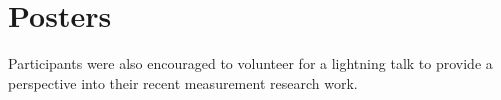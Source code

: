 \section{Posters}\label{sec:posters}

Participants were also encouraged to volunteer for a lightning talk to provide
a perspective into their recent measurement research work.

